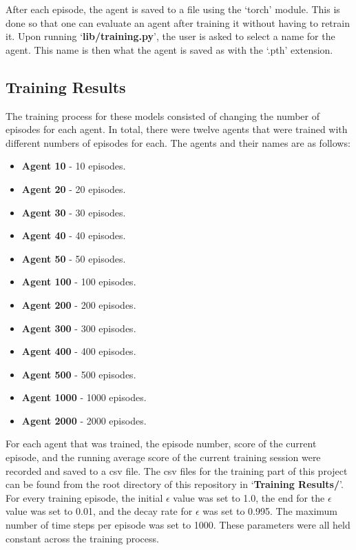 \documentclass[
	a4paper, %
	10pt, %
	unnumberedsections, %
	twoside, %
]{LTJournalArticle}
\begin{document}
After each episode, the agent is saved to a file using the `torch' module. This is done so that one can evaluate an agent after training it without having to retrain it. Upon running `\textbf{lib/training.py}',
the user is asked to select a name for the agent. This name is then what the agent is saved as with the `.pth' extension.

\subsection{Training Results}

The training process for these models consisted of changing the number of episodes for each agent. In total, there were twelve agents that were trained with different numbers of episodes for each. The
agents and their names are as follows:

\begin{itemize}
	\item \textbf{Agent 10} - 10 episodes.
	\item \textbf{Agent 20} - 20 episodes.
	\item \textbf{Agent 30} - 30 episodes.
	\item \textbf{Agent 40} - 40 episodes.
	\item \textbf{Agent 50} - 50 episodes.
	\item \textbf{Agent 100} - 100 episodes.
	\item \textbf{Agent 200} - 200 episodes.
	\item \textbf{Agent 300} - 300 episodes.
	\item \textbf{Agent 400} - 400 episodes.
	\item \textbf{Agent 500} - 500 episodes.
	\item \textbf{Agent 1000} - 1000 episodes.
	\item \textbf{Agent 2000} - 2000 episodes.
\end{itemize}

For each agent that was trained, the episode number, score of the current episode, and the running average score of the current training session were recorded and saved to a csv file. The csv files
for the training part of this project can be found from the root directory of this repository in `\textbf{Training Results/}'. For every training episode, the initial $\epsilon$ value was set to 1.0,
the end for the $\epsilon$ value was set to 0.01, and the decay rate for $\epsilon$ was set to 0.995. The maximum number of time steps per episode was set to 1000. These parameters were all held constant
across the training process.
\end{document}
